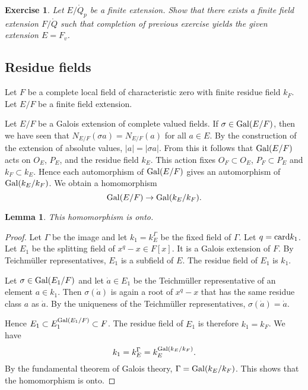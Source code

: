 \documentclass{amsart}
\newtheorem{lemma}[equation]{Lemma}
\newtheorem{exercise}{Exercise}
\def\abs#1{{|#1|}}
\def\oG{\op{Gal}}
\begin{document}

\begin{exercise}  Let $E/\ring{Q}_p$ be a finite extension.  Show that there
exists a finite field extension $F/\ring{Q}$ such that completion of previous
exercise yields the given extension $E=F_v$.
\end{exercise}

\subsection{Residue fields}

Let $F$ be a complete local field of characteristic zero with finite residue field $k_F$.
Let $E/F$ be a finite field extension.

Let $E/F$ be a Galois extension of complete valued fields.
If $\sigma\in\oG(E/F)$, then we have seen that $N_{E/F}(\sigma a) = N_{E/F}(a)$
for all $a\in E$.  By the construction of the extension of absolute values,
$\abs{a}=\abs{\sigma{a}}$.  From this it follows that $\oG(E/F)$
acts on $O_E$, $P_E$, and the residue field $k_E$.
This action fixes $O_F\subset O_E$, $P_F\subset P_E$ and $k_F\subset k_E$.
Hence each automorphism of $\oG(E/F)$ gives an automorphism of 
$\oG(k_E/k_F)$.  We obtain a homomorphism
\[
\oG(E/F)\to \oG(k_E/k_F).
\]

\begin{lemma} This homomorphism is onto.
\end{lemma}

\begin{proof} Let $\Gamma$ be the image and let $k_1 = k_E^\Gamma$ be the fixed
field of $\Gamma$.  Let $q={\operatorname{card}}{k_1}$.  Let $E_1$ be the splitting field
of $x^q-x\in F[x]$.  It is a Galois extension of $F$.
By Teichm\"uller representatives, $E_1$ is a subfield
of $E$.  The residue field of $E_1$ is $k_1$.

Let $\sigma\in \oG(E_1/F)$ and let $\dot a\in E_1$ be 
the Teichm\"uller representative of an element $a\in k_1$.
Then $\sigma (\dot a)$ is again a root of $x^q-x$ that has the
same residue class $a$ as $\dot a$.  By the uniqueness of the Teichm\"uller
representatives, $\sigma(\dot a) = \dot a$.  

Hence $E_1\subset E_1^{\oG(E_1/F)} \subset F$.  The residue field of 
$E_1$ is therefore $k_1 = k_F$.  We have
\[
k_1 = k_E^\Gamma = k_E^{\oG(k_E/k_F)}.
\]
By the fundamental theorem of Galois theory, $\Gamma=\oG(k_E/k_F)$.
This shows that the homomorphism is onto.
\end{proof}
\end{document}

